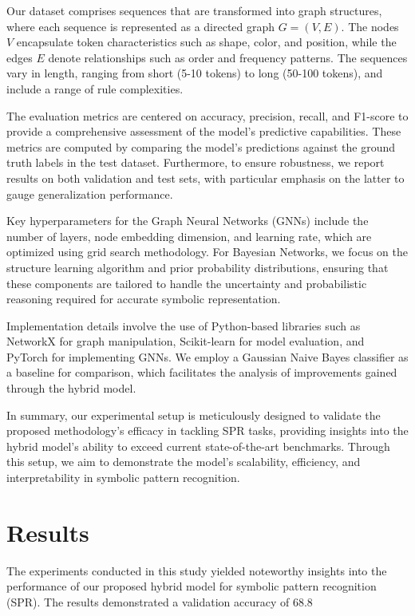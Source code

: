 \documentclass{article}
\begin{document}
Our dataset comprises sequences that are transformed into graph structures, where each sequence is represented as a directed graph \(G = (V, E)\). The nodes \(V\) encapsulate token characteristics such as shape, color, and position, while the edges \(E\) denote relationships such as order and frequency patterns. The sequences vary in length, ranging from short (5-10 tokens) to long (50-100 tokens), and include a range of rule complexities.

The evaluation metrics are centered on accuracy, precision, recall, and F1-score to provide a comprehensive assessment of the model's predictive capabilities. These metrics are computed by comparing the model's predictions against the ground truth labels in the test dataset. Furthermore, to ensure robustness, we report results on both validation and test sets, with particular emphasis on the latter to gauge generalization performance.

Key hyperparameters for the Graph Neural Networks (GNNs) include the number of layers, node embedding dimension, and learning rate, which are optimized using grid search methodology. For Bayesian Networks, we focus on the structure learning algorithm and prior probability distributions, ensuring that these components are tailored to handle the uncertainty and probabilistic reasoning required for accurate symbolic representation.

Implementation details involve the use of Python-based libraries such as NetworkX for graph manipulation, Scikit-learn for model evaluation, and PyTorch for implementing GNNs. We employ a Gaussian Naive Bayes classifier as a baseline for comparison, which facilitates the analysis of improvements gained through the hybrid model.

In summary, our experimental setup is meticulously designed to validate the proposed methodology's efficacy in tackling SPR tasks, providing insights into the hybrid model's ability to exceed current state-of-the-art benchmarks. Through this setup, we aim to demonstrate the model's scalability, efficiency, and interpretability in symbolic pattern recognition.

\section{Results}
The experiments conducted in this study yielded noteworthy insights into the performance of our proposed hybrid model for symbolic pattern recognition (SPR). The results demonstrated a validation accuracy of 68.8%
\end{document}
